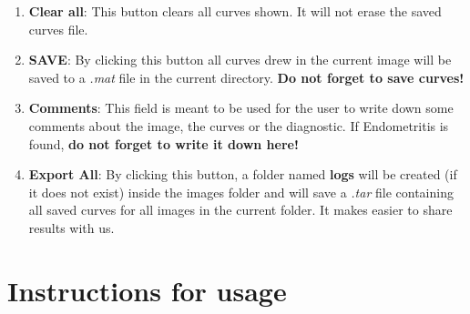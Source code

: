 \documentclass[12pt,a4paper,titlepage]{report}
\begin{document}
\begin{enumerate}
	\item \textbf{Clear all}: This button clears all curves shown. It will not erase the saved curves file.
	\item \textbf{SAVE}: By clicking this button all curves drew in the current image will be saved to a \emph{.mat} file in the current directory. \textbf{Do not forget to save curves!}
	\item \textbf{Comments}: This field is meant to be used for the user to write down some comments about the image, the curves or the diagnostic. If Endometritis is found, \textbf{do not forget to write it down here!}
	\item \textbf{Export All}: By clicking this button, a folder named \textbf{logs} will be created (if it does not exist) inside the images folder and will save a \emph{.tar} file containing all saved curves for all images in the current folder. It makes easier to share results with us.
\end{enumerate}


\section{Instructions for usage}
\end{document}

